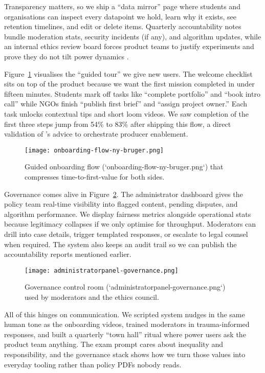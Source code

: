 Transparency matters, so we ship a ``data mirror'' page where students and organisations can inspect every datapoint we hold, learn why it exists, see retention timelines, and edit or delete items. Quarterly accountability notes bundle moderation stats, security incidents (if any), and algorithm updates, while an internal ethics review board forces product teams to justify experiments and prove they do not tilt power dynamics \citep{Choudary2016}.

Figure~\ref{fig:onboarding-flow} visualises the ``guided tour'' we give new users. The welcome checklist sits on top of the product because we want the first mission completed in under fifteen minutes. Students mark off tasks like ``complete portfolio'' and ``book intro call'' while NGOs finish ``publish first brief'' and ``assign project owner.'' Each task unlocks contextual tips and short loom videos. We saw completion of the first three steps jump from 54\% to 83\% after shipping this flow, a direct validation of \citet{Choudary2016}'s advice to orchestrate producer enablement.

\begin{figure}[h]
  \centering
  \texttt{[image: onboarding-flow-ny-bruger.png]}
  \caption{Guided onboarding flow (`onboarding-flow-ny-bruger.png`) that compresses time-to-first-value for both sides.}
  \label{fig:onboarding-flow}
\end{figure}

Governance comes alive in Figure~\ref{fig:admin-panel}. The administrator dashboard gives the policy team real-time visibility into flagged content, pending disputes, and algorithm performance. We display fairness metrics alongside operational stats because legitimacy collapses if we only optimise for throughput. Moderators can drill into case details, trigger templated responses, or escalate to legal counsel when required. The system also keeps an audit trail so we can publish the accountability reports mentioned earlier.

\begin{figure}[h]
  \centering
  \texttt{[image: administratorpanel-governance.png]}
  \caption{Governance control room (`administratorpanel-governance.png`) used by moderators and the ethics council.}
  \label{fig:admin-panel}
\end{figure}

All of this hinges on communication. We scripted system nudges in the same human tone as the onboarding videos, trained moderators in trauma-informed responses, and built a quarterly ``town hall'' ritual where power users ask the product team anything. The exam prompt cares about inequality and responsibility, and the governance stack shows how we turn those values into everyday tooling rather than policy PDFs nobody reads.
